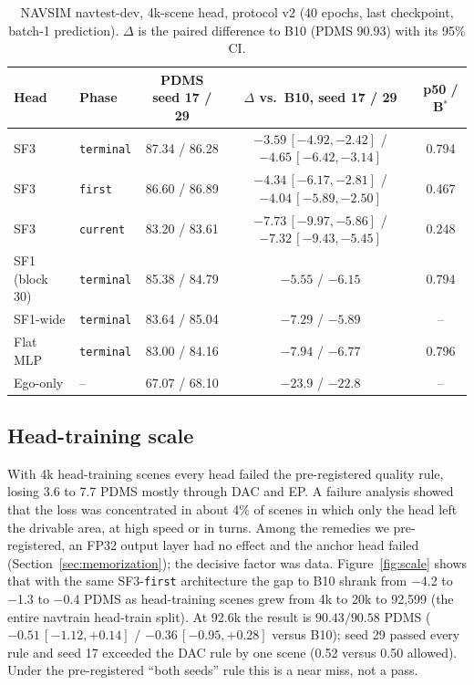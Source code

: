 \documentclass[10pt]{article}
\newcommand{\Bstar}{B$^{*}$}
\newcommand{\first}{\texttt{first}}
\newcommand{\current}{\texttt{current}}
\newcommand{\terminal}{\texttt{terminal}}
\begin{document}
\begin{table}[t]
\caption{NAVSIM navtest-dev, 4k-scene head, protocol v2 (40 epochs, last checkpoint, batch-1 prediction). $\Delta$ is the paired difference to B10 (PDMS 90.93) with its 95\% CI.}
\label{tab:navsim-phases}
\begin{center}
\footnotesize
\setlength{\tabcolsep}{4pt}
\begin{tabular}{llccc}
\toprule
Head & Phase & PDMS seed 17 / 29 & $\Delta$ vs.\ B10, seed 17 / 29 & p50 / \Bstar{} \\
\midrule
SF3 & \terminal{} & 87.34 / 86.28 & $-3.59\,[-4.92,-2.42]$ / $-4.65\,[-6.42,-3.14]$ & 0.794 \\
SF3 & \first{}    & 86.60 / 86.89 & $-4.34\,[-6.17,-2.81]$ / $-4.04\,[-5.89,-2.50]$ & 0.467 \\
SF3 & \current{}  & 83.20 / 83.61 & $-7.73\,[-9.97,-5.86]$ / $-7.32\,[-9.43,-5.45]$ & 0.248 \\
SF1 (block 30) & \terminal{} & 85.38 / 84.79 & $-5.55$ / $-6.15$ & 0.794 \\
SF1-wide & \terminal{} & 83.64 / 85.04 & $-7.29$ / $-5.89$ & -- \\
Flat MLP & \terminal{} & 83.00 / 84.16 & $-7.94$ / $-6.77$ & 0.796 \\
Ego-only & -- & 67.07 / 68.10 & $-23.9$ / $-22.8$ & -- \\
\bottomrule
\end{tabular}
\end{center}
\end{table}

\subsection{Head-training scale}
\label{sec:navsim-scale}

With 4k head-training scenes every head failed the pre-registered quality rule, losing 3.6 to 7.7 PDMS mostly through DAC and EP. A failure analysis showed that the loss was concentrated in about 4\% of scenes in which only the head left the drivable area, at high speed or in turns. Among the remedies we pre-registered, an FP32 output layer had no effect and the anchor head failed (Section~\ref{sec:memorization}); the decisive factor was data. Figure~\ref{fig:scale} shows that with the same SF3-\first{} architecture the gap to B10 shrank from $-$4.2 to $-$1.3 to $-$0.4 PDMS as head-training scenes grew from 4k to 20k to 92,599 (the entire navtrain head-train split). At 92.6k the result is $90.43 / 90.58$ PDMS ($-0.51\,[-1.12, +0.14]$ / $-0.36\,[-0.95, +0.28]$ versus B10); seed 29 passed every rule and seed 17 exceeded the DAC rule by one scene (0.52 versus 0.50 allowed). Under the pre-registered ``both seeds'' rule this is a near miss, not a pass.
\end{document}
